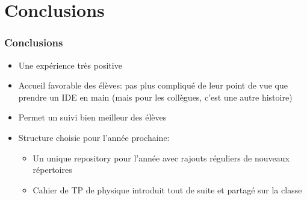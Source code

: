 \section{Conclusions}

\begin{frame}
  \frametitle{Conclusions}
  

  \begin{itemize}[<+->]
      \item Une expérience très positive

      \item Accueil favorable des élèves: pas plus compliqué de leur point de vue que prendre un IDE en main (mais pour les collègues, c'est une autre histoire)

      \item Permet un suivi bien meilleur des élèves

      \item Structure choisie pour l'année prochaine:
        \begin{itemize}
            \item Un unique repository pour l'année avec rajouts réguliers de nouveaux répertoires

            \item Cahier de TP de physique introduit tout de suite et partagé sur la classe
        \end{itemize}

  \end{itemize}

\end{frame}
